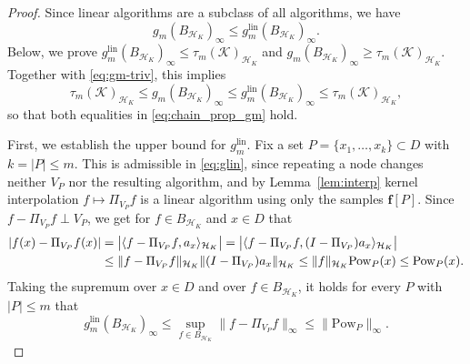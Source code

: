 \documentclass[10pt,a4paper]{amsart}
\newcommand{\ip}[2]{\langle #1,#2\rangle}
\newcommand{\lin}{\ensuremath{\mathrm{lin}}}
\newcommand{\norm}[1]{\lVert #1\rVert}
\begin{document}
\begin{proof}
Since linear algorithms are a subclass of all algorithms, we have
\begin{equation}\label{eq:gm-triv}
    g_m(B_{\mathcal H_K})_\infty \le g_m^{\lin}(B_{\mathcal H_K})_\infty.
\end{equation}
Below, we prove $g_m^{\lin}(B_{\mathcal H_K})_\infty\le\tau_m(\mathcal{K})_{\mathcal{H}_K}$ and $g_m(B_{\mathcal H_K})_\infty\ge\tau_m(\mathcal{K})_{\mathcal{H}_K}$.
Together with \eqref{eq:gm-triv}, this implies
\begin{equation}
    \tau_m(\mathcal{K})_{\mathcal{H}_K} \le g_m(B_{\mathcal H_K})_\infty \le g_m^{\lin}(B_{\mathcal H_K})_\infty \le \tau_m(\mathcal{K})_{\mathcal{H}_K},
\end{equation}
so that both equalities in \eqref{eq:chain_prop_gm} hold.
 
First, we establish the upper bound for $g_m^{\lin}$.
Fix a set $P=\{x_1,\dots,x_k\}\subset D$ with $k=|P|\le m$.
This is admissible in \eqref{eq:glin}, since repeating a node changes neither $V_P$ nor the resulting algorithm, and by Lemma~\ref{lem:interp} kernel interpolation $f\mapsto\Pi_{V_P}f$ is a linear algorithm using only the samples $\mathbf f[P]$.
Since $f-\Pi_{V_P}f\perp V_P$, we get for $f\in B_{\mathcal H_K}$ and $x\in D$ that
\begin{align}
    |f(x)-\Pi_{V_P}f(x)| &= \bigl|\ip{f-\Pi_{V_P}f}{a_x}_{\mathcal H_K}\bigr|
    = \bigl|\ip{f-\Pi_{V_P}f}{(I-\Pi_{V_P})a_x}_{\mathcal H_K}\bigr| \notag\\
    & \le \norm{f-\Pi_{V_P}f}_{\mathcal H_K} \norm{ (I-\Pi_{V_P})a_x  }_{\mathcal H_K}\le \norm{f}_{\mathcal H_K} \mathrm{Pow}_P(x) \le \mathrm{Pow}_P(x).
\end{align}
Taking the supremum over $x\in D$ and over $f\in B_{\mathcal H_K}$, it holds for every $P$ with $|P|\le m$ that
\begin{equation}
    g_m^{\lin}(B_{\mathcal H_K})_\infty \le
    \sup_{f\in B_{\mathcal H_K}}\norm{f-\Pi_{V_P}f}_\infty \le \norm{\mathrm{Pow}_P}_\infty.
\end{equation}
 

\end{proof}
\end{document}
